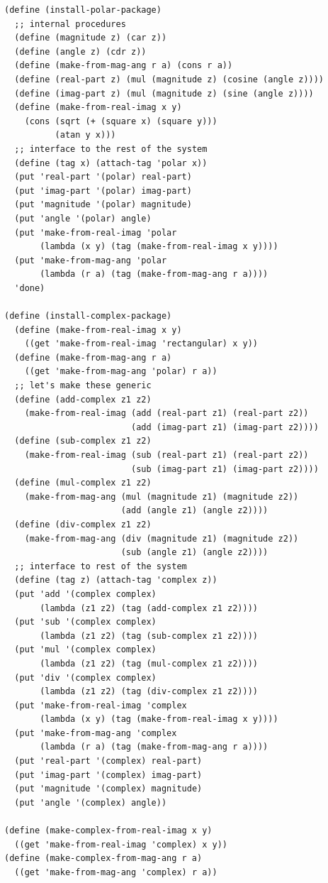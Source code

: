 \documentclass[final,fleqn,titlepage,twoside]{article}
\begin{document}
\begin{verbatim}
(define (install-polar-package)
  ;; internal procedures
  (define (magnitude z) (car z))
  (define (angle z) (cdr z))
  (define (make-from-mag-ang r a) (cons r a))
  (define (real-part z) (mul (magnitude z) (cosine (angle z))))
  (define (imag-part z) (mul (magnitude z) (sine (angle z))))
  (define (make-from-real-imag x y)
    (cons (sqrt (+ (square x) (square y)))
          (atan y x)))
  ;; interface to the rest of the system
  (define (tag x) (attach-tag 'polar x))
  (put 'real-part '(polar) real-part)
  (put 'imag-part '(polar) imag-part)
  (put 'magnitude '(polar) magnitude)
  (put 'angle '(polar) angle)
  (put 'make-from-real-imag 'polar
       (lambda (x y) (tag (make-from-real-imag x y))))
  (put 'make-from-mag-ang 'polar
       (lambda (r a) (tag (make-from-mag-ang r a))))
  'done)

(define (install-complex-package)
  (define (make-from-real-imag x y)
    ((get 'make-from-real-imag 'rectangular) x y))
  (define (make-from-mag-ang r a)
    ((get 'make-from-mag-ang 'polar) r a))
  ;; let's make these generic
  (define (add-complex z1 z2)
    (make-from-real-imag (add (real-part z1) (real-part z2))
                         (add (imag-part z1) (imag-part z2))))
  (define (sub-complex z1 z2)
    (make-from-real-imag (sub (real-part z1) (real-part z2))
                         (sub (imag-part z1) (imag-part z2))))
  (define (mul-complex z1 z2)
    (make-from-mag-ang (mul (magnitude z1) (magnitude z2))
                       (add (angle z1) (angle z2))))
  (define (div-complex z1 z2)
    (make-from-mag-ang (div (magnitude z1) (magnitude z2))
                       (sub (angle z1) (angle z2))))
  ;; interface to rest of the system
  (define (tag z) (attach-tag 'complex z))
  (put 'add '(complex complex)
       (lambda (z1 z2) (tag (add-complex z1 z2))))
  (put 'sub '(complex complex)
       (lambda (z1 z2) (tag (sub-complex z1 z2))))
  (put 'mul '(complex complex)
       (lambda (z1 z2) (tag (mul-complex z1 z2))))
  (put 'div '(complex complex)
       (lambda (z1 z2) (tag (div-complex z1 z2))))
  (put 'make-from-real-imag 'complex
       (lambda (x y) (tag (make-from-real-imag x y))))
  (put 'make-from-mag-ang 'complex
       (lambda (r a) (tag (make-from-mag-ang r a))))
  (put 'real-part '(complex) real-part)
  (put 'imag-part '(complex) imag-part)
  (put 'magnitude '(complex) magnitude)
  (put 'angle '(complex) angle))

(define (make-complex-from-real-imag x y)
  ((get 'make-from-real-imag 'complex) x y))
(define (make-complex-from-mag-ang r a)
  ((get 'make-from-mag-ang 'complex) r a))


\end{verbatim}
\end{document}
